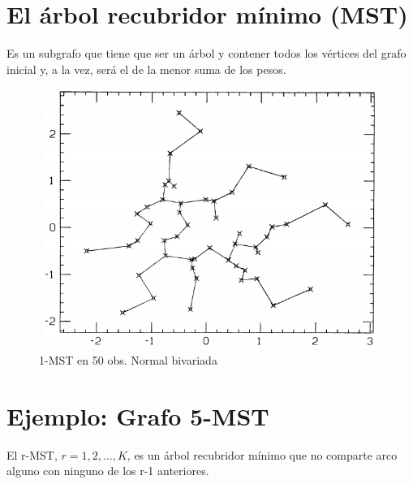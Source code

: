 \documentclass[]{book}
\begin{document}
\section{El árbol recubridor mínimo
(MST)}\label{el-arbol-recubridor-minimo-mst}

Es un subgrafo que tiene que ser un árbol y contener todos los vértices
del grafo inicial y, a la vez, será el de la menor suma de los pesos.

\begin{figure}

{\centering \includegraphics[width=450,height=320]{1-MST} 

}

\caption{1-MST en 50 obs. Normal bivariada}\label{fig:unnamed-chunk-7}
\end{figure}

\section{Ejemplo: Grafo 5-MST}\label{ejemplo-grafo-5-mst}

El r-MST, \(r={1, 2,...,K}\), es un árbol recubridor mínimo que no
comparte arco alguno con ninguno de los r-1 anteriores.
\end{document}
